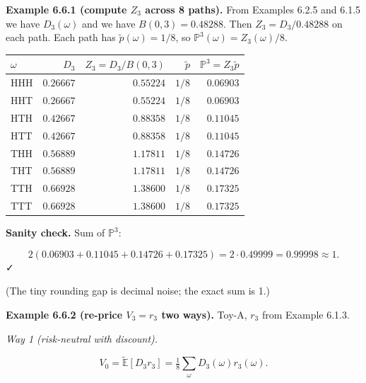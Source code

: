 \documentclass[
  10pt,
  twoside]{book}
\newcounter{none} %
\begin{document}
\textbf{Example 6.6.1 (compute \(Z_3\) across 8 paths).} From Examples
6.2.5 and 6.1.5 we have \(D_3(\omega)\) and we have
\(B(0, 3) = 0.48288\). Then \(Z_3 = D_3/0.48288\) on each path. Each
path has \(\tilde p(\omega) = 1/8\), so
\(\mathbb P^3(\omega) = Z_3(\omega)/8\).

{\def\LTcaptype{none} %
\begin{table}[H]
\centering
\begin{tabular}{|l|r|r|r|r|}
\toprule
\(\omega\) & \(D_3\) & \(Z_3 = D_3/B(0, 3)\) & \(\tilde p\) & \(\mathbb P^3 = Z_3 \tilde p\) \\
\midrule



HHH & \(0.26667\) & \(0.55224\) & \(1/8\) & \(0.06903\) \\
HHT & \(0.26667\) & \(0.55224\) & \(1/8\) & \(0.06903\) \\
HTH & \(0.42667\) & \(0.88358\) & \(1/8\) & \(0.11045\) \\
HTT & \(0.42667\) & \(0.88358\) & \(1/8\) & \(0.11045\) \\
THH & \(0.56889\) & \(1.17811\) & \(1/8\) & \(0.14726\) \\
THT & \(0.56889\) & \(1.17811\) & \(1/8\) & \(0.14726\) \\
TTH & \(0.66928\) & \(1.38600\) & \(1/8\) & \(0.17325\) \\
TTT & \(0.66928\) & \(1.38600\) & \(1/8\) & \(0.17325\) \\
\bottomrule
\end{tabular}
\end{table}
}

\textbf{Sanity check.} Sum of \(\mathbb P^3\):

\[2(0.06903 + 0.11045 + 0.14726 + 0.17325) = 2 \cdot 0.49999 = 0.99998 \approx 1.\]
✓

(The tiny rounding gap is decimal noise; the exact sum is 1.)

\textbf{Example 6.6.2 (re-price \(V_3 = r_3\) two ways).} Toy-A, \(r_3\)
from Example 6.1.3.

\emph{Way 1 (risk-neutral with discount).}

\[V_0 = \tilde{\mathbb E}[D_3 r_3] = \tfrac{1}{8}\sum_\omega D_3(\omega) r_3(\omega).\]
\end{document}
